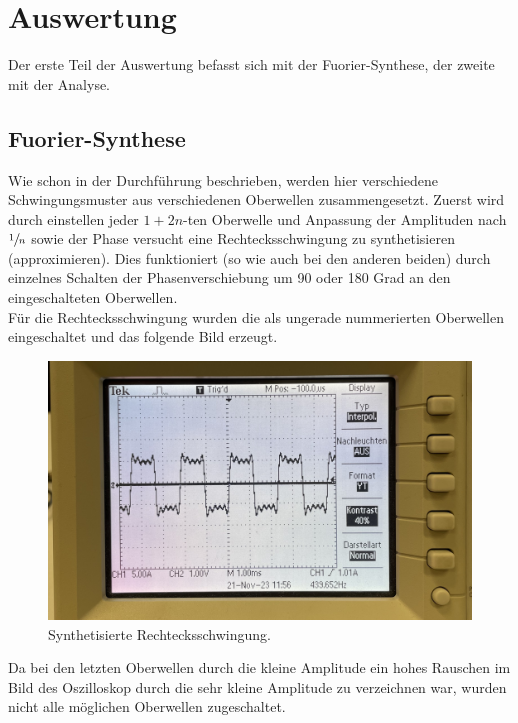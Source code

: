 \section{Auswertung}
Der erste Teil der Auswertung befasst sich mit der Fuorier-Synthese, der zweite mit der Analyse.
\label{sec:Auswertung}
\subsection{Fuorier-Synthese}
Wie schon in der Durchführung beschrieben, werden hier verschiedene Schwingungsmuster aus verschiedenen Oberwellen 
zusammengesetzt. Zuerst wird durch einstellen jeder $1+2n$-ten Oberwelle und Anpassung der Amplituden nach 
$\sfrac{1}{n}$ sowie der Phase versucht eine Rechtecksschwingung zu synthetisieren (approximieren).
Dies funktioniert (so wie auch bei den anderen beiden) durch einzelnes Schalten der Phasenverschiebung um 90 oder 
180 Grad an den eingeschalteten Oberwellen.\\ \noindent
Für die Rechtecksschwingung wurden die als ungerade nummerierten Oberwellen eingeschaltet und das folgende Bild erzeugt.
\begin{figure}[H]
  \centering
  \includegraphics[scale=0.06]{Messdaten_Bilder/Rechtecksschwingung.jpeg}
  \caption{Synthetisierte Rechtecksschwingung.}
  \label{fig:Rechtecksschwingung}
\end{figure}\noindent
Da bei den letzten Oberwellen durch die kleine Amplitude ein hohes Rauschen im Bild des Oszilloskop durch die sehr kleine 
Amplitude zu verzeichnen war, wurden nicht alle möglichen Oberwellen zugeschaltet.
